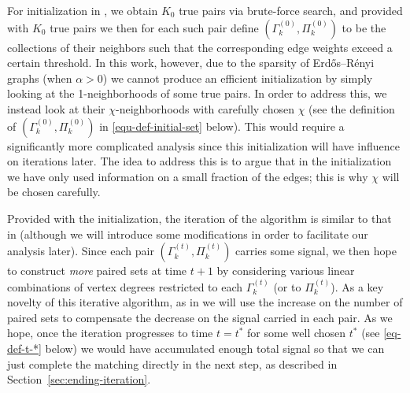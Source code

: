 \documentclass[11pt]{article}
\numberwithin{equation}{section}
\begin{document}
For initialization in \cite{DL22+}, we obtain $K_0$ true pairs via brute-force search, and provided with $K_0$ true pairs we then for each such pair define $(\Gamma^{(0)}_k, \Pi^{(0)}_k)$ to be the collections of their neighbors such that the corresponding edge weights exceed a certain threshold. In this work, however, due to the sparsity of Erd\H{o}s--R\'enyi graphs (when $\alpha>0$) we cannot produce an efficient initialization by simply looking at the 1-neighborhoods of some true pairs. In order to address this, we instead look at their $\chi$-neighborhoods with carefully chosen $\chi$ (see the definition of $(\Gamma^{(0)}_k, \Pi^{(0)}_k)$ in \eqref{equ-def-initial-set} below). This would require a significantly more complicated analysis since this initialization will have influence on iterations later. The idea to address this is to argue that in the initialization we have only used information on a small fraction of the edges; this is why $\chi$ will be chosen carefully.

Provided with the initialization, the iteration of the algorithm is similar to that in \cite{DL22+} (although we will introduce some modifications in order to facilitate our analysis later). Since each pair $(\Gamma^{(t)}_k,\Pi^{(t)}_k)$ carries some signal, we then hope to construct \emph{more} paired sets at time $t+1$ by considering various linear combinations of vertex degrees restricted to each $\Gamma^{(t)}_k$ (or to $\Pi^{(t)}_k$). As a key novelty of this iterative algorithm, as in \cite{DL22+} we will use the increase on the number of paired sets to compensate the decrease on the signal carried in each pair. As we hope, once the iteration progresses to time $t = t^*$  for some well chosen $t^*$ (see \eqref{eq-def-t-*} below) we would have accumulated enough total signal so that we can just complete the matching directly in the next step, as described in Section~\ref{sec:ending-iteration}. 
\end{document}
